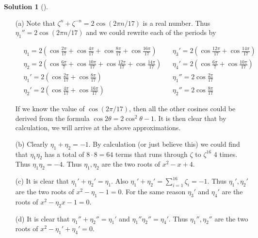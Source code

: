 \documentclass{article}
\theoremstyle{definition}
\newtheorem*{sol}{Solution}
\newenvironment{sols}[1][]{%
  \begin{sol}[#1]$ $\par\nobreak\ignorespaces
}{%
  \end{sol}
}
\begin{document}
\begin{sols}
	\begin{enumerate}
		\item[(a)] Note that $\zeta^n + \zeta^{-n} = 2 \cos (2 \pi n/17)$ is a real number.
			Thus $\eta_1'' = 2 \cos (2 \pi n/17)$ and we could rewrite each of the periods by
			
			\begin{align*}
				&\eta_1 = 2 \left( \cos \frac{2 \pi}{17} + \cos \frac{4 \pi}{17} + \cos \frac{8 \pi}{17} + \cos \frac{16 \pi}{17} \right) & &\eta_3' = 2 \left( \cos \frac{12 \pi}{17} + \cos \frac{14 \pi}{17}\right)\\
				&\eta_2 = 2 \left( \cos \frac{6 \pi}{7} + \cos \frac{10 \pi}{17} + \cos \frac{12 \pi}{17} + \cos \frac{14 \pi}{17} \right) & &\eta_4' = 2 \left( \cos \frac{6 \pi}{7} + \cos \frac{10 \pi}{17}\right)\\
				&\eta_1' = 2 \left( \cos \frac{2 \pi}{17} + \cos \frac{8 \pi}{17}\right) & &\eta_1'' = 2 \cos \frac{2 \pi}{17}\\
				&\eta_2' = 2 \left( \cos \frac{4 \pi}{17} + \cos \frac{16 \pi}{17}\right) & &\eta_2'' = 2 \cos \frac{8 \pi}{17} 
			\end{align*}

			If we know the value of $\cos (2 \pi/17)$, then all the other cosines could be derived from the formula $\cos 2 \theta = 2 \cos^2 \theta - 1$.
			It is then clear that by calculation, we will arrive at the above approximations.

		\item[(b)] Clearly $\eta_1 + \eta_2 = -1$.
			By calculation (or just believe this) we could find that $\eta_1 \eta_2$ has a total of $8 \cdot 8 = 64$ terms that runs through $\zeta$ to $\zeta^{16}$ 4 times.
			Thus $\eta_1 \eta_2 = -4$.
			Thus $\eta_1, \eta_2$ are the two roots of $x^2 - x + 4$.

		\item[(c)] It is clear that $\eta_1' + \eta_2' = \eta_1$.
			Also $\eta_1' + \eta_2' = \sum_{i = 1}^{16} \zeta_i = -1$.
			Thus $\eta_1', \eta_2'$ are the two roots of $x^2 - \eta_1 - 1 = 0$.
			For the same reason $\eta_3'$ and $\eta_4'$ are the roots of $x^2 - \eta_2 x - 1 = 0$.

		\item[(d)] It is clear that $\eta_1'' + \eta_2'' = \eta_1'$ and $\eta_1'' \eta_2'' = \eta_4'$.
			Thus $\eta_1'', \eta_2''$ are the two roots of $x^2 - \eta_1' + \eta_4' = 0$.
	\end{enumerate}
\end{sols}
\end{document}
